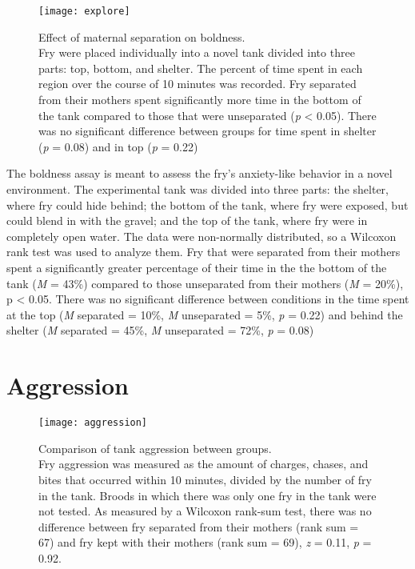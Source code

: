 \documentclass[12pt,twoside]{reedthesis}
\begin{document}
\begin{figure}[htbp] 
\begin{center} 
\texttt{[image: explore]}
\caption[Effect of maternal separation on boldness]{\footnotesize{Effect of
    maternal separation on boldness.\\ Fry were placed individually into a novel tank
    divided into three parts: top, bottom, and shelter. The percent of time
    spent in each region over the course of 10 minutes was recorded. Fry
    separated from their mothers spent significantly more time in the bottom of
    the tank compared to those that were unseparated (\textit{p} < 0.05). There was
    no significant difference between groups for time spent in shelter
    (\textit{p} = 0.08) and in top (\textit{p} = 0.22)}}
\label{subd}
\end{center} 
\end{figure}

The boldness assay is meant to assess the fry's anxiety-like behavior in a novel
environment. The experimental tank was divided into three parts: the shelter,
where fry could hide behind; the bottom of the tank, where fry were exposed, but
could blend in with the gravel; and the top of the tank, where fry were in
completely open water. The data were non-normally distributed, so a Wilcoxon
rank test was used to analyze them. Fry that were separated from their mothers spent a
significantly greater percentage of their time in the the bottom of the tank
(\textit{M} = 43\%) compared to those unseparated from their mothers (\textit{M}
= 20\%), p < 0.05. There was no significant difference between conditions in the
time spent at the top (\textit{M} separated = 10\%, \textit{M} unseparated =
5\%, \textit{p} = 0.22) and behind the shelter (\textit{M} separated = 45\%,
\textit{M} unseparated = 72\%, \textit{p} = 0.08) 

\section{Aggression}
\begin{figure}[htbp] 
\begin{center} 
\texttt{[image: aggression]}
\caption[Comparison of tank aggression between
groups]{\footnotesize{Comparison of tank aggression between groups.\\ Fry aggression was measured
  as the amount of charges, chases, and bites that occurred within 10 minutes,
  divided by the number of fry in the tank. Broods in which there was only one
  fry in the tank were not tested. As measured by a Wilcoxon rank-sum test,
  there was no difference between fry separated from their mothers (rank sum =
  67) and fry kept with their mothers (rank sum = 69), \textit{z} = 0.11,
  \textit{p} = 0.92}.}
\label{subd}
\end{center} 
\end{figure}
\end{document}
